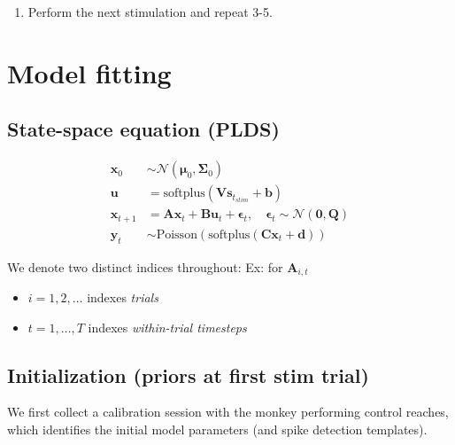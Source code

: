 \documentclass[11pt,letterpaper]{article} %
\begin{document}
\begin{enumerate}
\begin{enumerate}
        \item \hyperref[sec:stim_selection]{\textbf{Stim selection}}: Choose the next stimulation $\bm{s}_{i+1}$ using the covariance estimate of $\hat{\bm{B}}_{i+1|i}$ ($\hat{\bm{\Sigma}}_{B_{i+1|i}}$), which is the uncertainty in the stim-to-latent mapping after trial $i+1$ after a given stimulation.
    \end{enumerate}
    \item Perform the next stimulation and repeat 3-5.
\end{enumerate}

\clearpage
\section*{Model fitting}
\label{sec:model_fitting}
\subsection*{State-space equation (PLDS)}
\vspace{-0.5cm}
\begin{align*}
    \bm{x}_0 &\sim \mathcal{N}(\boldsymbol{\mu}_0, \boldsymbol{\Sigma}_0)\\
    \bm{u} &= \text{softplus}\!\left(\bm{V}\bm{s}_{t_{stim}} + \bm{b}\right) \\
    \bm{x}_{t+1} &= \bm{A}\bm{x}_t + \bm{B}\bm{u}_t + \boldsymbol{\epsilon}_t, \quad \boldsymbol{\epsilon}_t \sim \mathcal{N}(\bm{0}, \bm{Q}) \\
    \bm{y}_t &\sim \text{Poisson}\!\left(\text{softplus}\!\left(\bm{C}\bm{x}_t + \bm{d}\right)\right)
\end{align*}
\vspace{-0.3cm}

We denote two distinct indices throughout: Ex: for $\bm{A}_{i, t}$
\begin{itemize}
    \item $i = 1, 2, \ldots$ indexes \emph{trials}
    \item $t = 1, \ldots, T$ indexes \emph{within-trial timesteps}
\end{itemize}
\subsection*{Initialization (priors at first stim trial)}
We first collect a calibration session with the monkey performing control reaches, which identifies
the initial model parameters (and spike detection templates).
\vspace{0.2cm}
\end{document}
